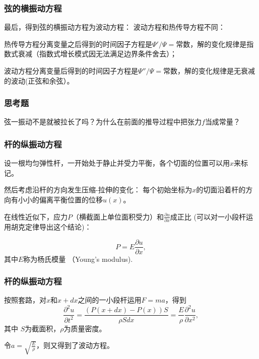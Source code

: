 \documentclass[CJK]{beamer}
\begin{document}
\begin{frame}
\frametitle{弦的横振动方程}

最后，得到弦的横振动方程为波动方程：
波动方程和热传导方程不同：
\bitem
\item{热传导方程分离变量之后得到的时间因子方程是$\Psi'/\Psi =$常数，解的变化规律是指数式衰减（指数式增长模式因无法满足边界条件舍去）；}
\item{波动方程分离变量后得到的时间因子方程是$\Psi''/\Psi =$常数，解的变化规律是无衰减的波动(正弦和余弦）。}
  \eitem


\end{frame}


\begin{frame}
\frametitle{思考题}


弦一振动不是就被拉长了吗？为什么在前面的推导过程中把张力$f$当成常量？

\end{frame}


\begin{frame}
\frametitle{杆的纵振动方程}

设一根均匀弹性杆，一开始处于静止并受力平衡，各个切面的位置可以用$x$来标记。

然后考虑沿杆的方向发生压缩-拉伸的变化： 每个初始坐标为$x$的切面沿着杆的方向有小小的偏离平衡位置的位移$u(x)$。


在线性近似下，应力$P$（横截面上单位面积受力）和$\frac{\partial u}{\partial x}$成正比 (可以对一小段杆运用胡克定律导出这个结论)：

$$ P = E\frac{\partial u}{\partial x},$$
其中$E$称为杨氏模量 （Young's modulus).


\end{frame}



\begin{frame}
\frametitle{杆的纵振动方程}


按照套路，对$x$和$x+dx$之间的一小段杆运用$F=ma$，得到
$$ \frac{\partial^2u}{\partial t^2} = \frac{(P(x+dx)-P(x))S}{\rho S dx} = \frac{E}{\rho} \frac{\partial^2u}{\partial x^2},$$
其中 $S$为截面积，$\rho$为质量密度。

\skipline

令$a = \sqrt{\frac{E}{\rho}}$，则又得到了波动方程。



\end{frame}
\end{document}
